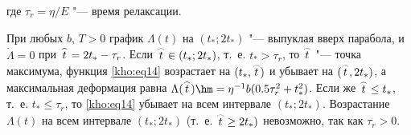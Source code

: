 где $\tau_r=\eta/E$ "--- время релаксации. 

При любых $b$, $T>0$ график $\Lambda(t)$ на $(t_\ast;2t_\ast)$ "--- выпуклая вверх парабола, и $\dot{\Lambda}=0$ при $\mathord{\buildrel{\lower3pt\hbox{$\scriptscriptstyle\frown$}}\over{t}}=2t_\ast-\tau_r$. Если $\mathord{\buildrel{\lower3pt\hbox{$\scriptscriptstyle\frown$}}\over{t}}\in(t_\ast;2t_\ast)$, т.~е. $t_\ast>\tau_r$, то $\mathord{\buildrel{\lower3pt\hbox{$\scriptscriptstyle\frown$}}\over {t}}$ "--- точка максимума, функция \eqref{kho:eq14} возрастает на $(t_\ast,\mathord{\buildrel{\lower3pt\hbox{$\scriptscriptstyle\frown$}}\over{t}})$ и убывает на $(\mathord{\buildrel{\lower3pt\hbox{$\scriptscriptstyle\frown$}}\over{t}},2t_\ast)$, а максимальная деформация равна $\Lambda(\mathord{\buildrel{\lower3pt\hbox{$\scriptscriptstyle\frown$}}\over{t}}) \hm =\eta^{-1}b(0.5\tau_r^2+t_\ast^2)$. Если же $\mathord{\buildrel{\lower3pt\hbox{$\scriptscriptstyle\frown$}}\over{t}}\le t_\ast$, т.~е. $t_\ast\le\tau_r$, то \eqref{kho:eq14} убывает на всем интервале $(t_\ast;2t_\ast)$. Возрастание $\Lambda(t)$ на всем интервале $(t_\ast;2t_\ast)$ (т.~е. $\mathord{\buildrel{\lower3pt\hbox{$\scriptscriptstyle\frown$}}\over{t}}\ge2t_\ast)$ невозможно, так как $\tau_r>0$.





